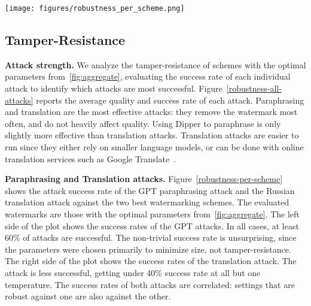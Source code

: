 \begin{figure*}[h!]
    \texttt{[image: figures/robustness\_per\_scheme.png]}
    \centering
    \caption{Success rate of various attacks against the two most competitive schemes at optimal paramters from~\cref{fig:aggregate}. 
    (Minimal size at 99\% quality and 20\% tamper-resistance). On the left, the GPT parahrase attack. On the right, the Russian translation attack. 
    The size of the watermark (median number of tokens needed for the watermark to be detectable) is indicated next to each point.}
    \label{robustness-per-scheme}
\end{figure*}

\subsection{Tamper-Resistance}
\label{ssec:robustness-eval}

%

\noindent\textbf{Attack strength.}
We analyze the tamper-resistance of schemes with the optimal parameters  
from~\cref{fig:aggregate}, evaluating the success rate of each
individual attack to identify which attacks are most successful.
Figure~\ref{robustness-all-attacks} reports the average quality and success rate of each attack.
Paraphrasing and translation are the most effective attacks:
they remove the watermark most often, and do not heavily affect quality.
Using Dipper to paraphrase is only slightly more effective than translation attacks. Translation attacks are easier to run since they 
either rely on smaller language models,
or can be done with online translation services such as Google Translate~\cite{googletranslate}. 

\smallskip\noindent\textbf{Paraphrasing and Translation attacks.} 
Figure~\ref{robustness-per-scheme} shows the attack success rate of the
GPT paraphrasing attack and the Russian translation attack against the two best watermarking schemes.
The evaluated watermarks are those with the optimal parameters from~\cref{fig:aggregate}.
The left side of the plot shows the success rates of the GPT attacks.
In all cases, at least 60\% of attacks are successful.
The non-trivial success rate is unsurprising, since 
the parameters were chosen primarily to minimize size, not tamper-resistance.
The right side of the plot shows the success rates of the translation attack. The attack 
is less successful, getting under 40\% success rate at all but one temperature.
The success rates of both attacks are correlated: settings that are robust against one are 
also against the other.

